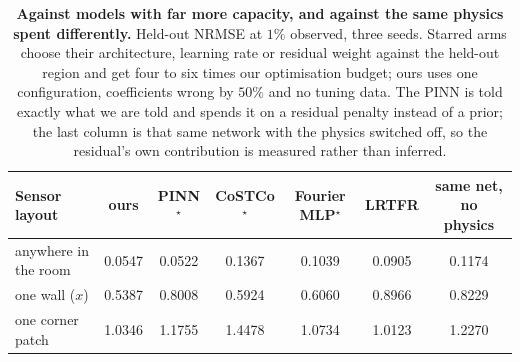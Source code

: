 \begin{table}[t]
  \centering
  \caption{\textbf{Against models with far more capacity, and against the same physics spent differently.}  Held-out NRMSE at $1\%$ observed, three seeds.  Starred arms choose their architecture, learning rate or residual weight against the held-out region and get four to six times our optimisation budget; ours uses one configuration, coefficients wrong by $50\%$ and no tuning data.  The PINN is told exactly what we are told and spends it on a residual penalty instead of a prior; the last column is that same network with the physics switched off, so the residual's own contribution is measured rather than inferred.}
  \label{tab:baselines-strong}
  \small
  \begin{tabular}{lcccccc}
    \toprule
    Sensor layout & ours & PINN$^\star$ & CoSTCo$^\star$ & Fourier MLP$^\star$ & LRTFR & same net, no physics \\
    \midrule
    anywhere in the room & 0.0547 & 0.0522 & 0.1367 & 0.1039 & 0.0905 & 0.1174 \\
    one wall ($x$) & 0.5387 & 0.8008 & 0.5924 & 0.6060 & 0.8966 & 0.8229 \\
    one corner patch & 1.0346 & 1.1755 & 1.4478 & 1.0734 & 1.0123 & 1.2270 \\
    \bottomrule
  \end{tabular}
\end{table}
